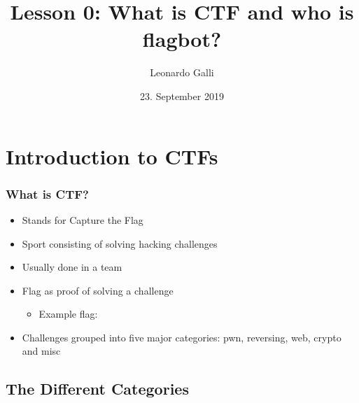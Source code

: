\documentclass[aspectratio=169]{beamer}
\title{Lesson 0: What is CTF and who is flagbot?}
\subtitle{}
\author{Leonardo Galli}
\date{23. September 2019}
\begin{document}
 

\titleframe

\tocframe

\section{Introduction to CTFs}
 
\begin{frame}[fragile]
\frametitle{What is CTF?}
\begin{itemize}
    \item Stands for Capture the Flag
    \item Sport consisting of solving hacking challenges
    \item Usually done in a team
    \item Flag as proof of solving a challenge
    \begin{itemize}
        \item Example flag: 
    \end{itemize}
    \item Challenges grouped into five major categories: pwn, reversing, web, crypto and misc
\end{itemize}
\end{frame}

\subsection{The Different Categories}
\end{document}
